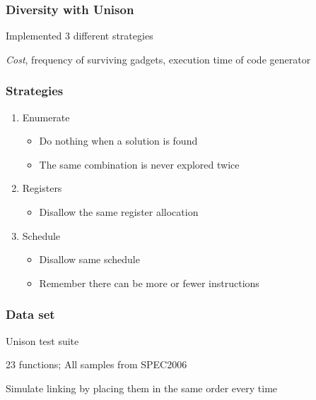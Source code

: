 \begin{frame}
	\frametitle{Diversity with Unison}

	Implemented 3 different strategies

	\vspace{0.5cm}

	\textit{Cost}, frequency of surviving gadgets, execution time of code generator

\end{frame}

\begin{frame}
	\frametitle{Strategies}

	\begin{enumerate}
		\item Enumerate
			\begin{itemize}
				\item Do nothing when a solution is found
				\item The same combination is never explored twice
			\end{itemize}
		\item Registers
			\begin{itemize}
				\item Disallow the same register allocation
			\end{itemize}
		\item Schedule
			\begin{itemize}
				\item Disallow same schedule
				\item Remember there can be more or fewer instructions
			\end{itemize}
	\end{enumerate}

\end{frame}

\begin{frame}
	\frametitle{Data set}

	Unison test suite

	\vspace{0.5cm}

	23 functions; All samples from SPEC2006

	\vspace{0.5cm}

	Simulate linking by placing them in the same order every time


\end{frame}


